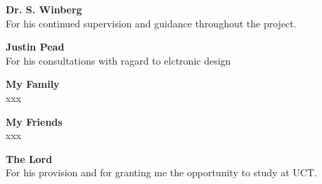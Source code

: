 \textbf{Dr. S. Winberg}\\
For his continued supervision and guidance throughout the project.

\textbf{Justin Pead}\\
For his consultations with ragard to elctronic design

\textbf{My Family}\\
xxx

\textbf{My Friends}\\
xxx

\textbf{The Lord}\\
For his provision and for granting me the opportunity to study at UCT.

